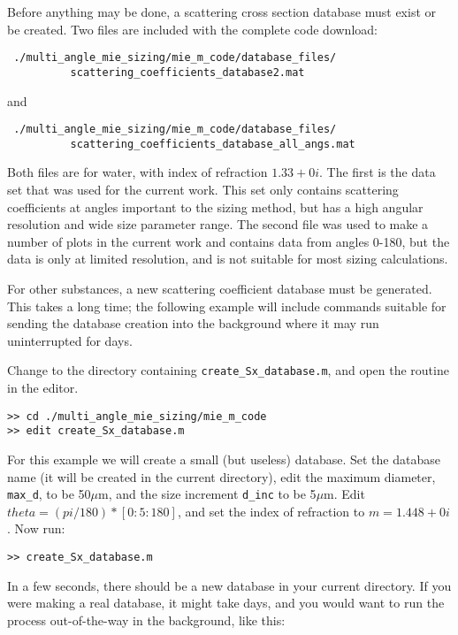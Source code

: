 Before anything may be done, a scattering cross section database must exist or be created.  Two files are included with the complete code download:
\begin{verbatim}
 ./multi_angle_mie_sizing/mie_m_code/database_files/
          scattering_coefficients_database2.mat
\end{verbatim}
and
\begin{verbatim}
 ./multi_angle_mie_sizing/mie_m_code/database_files/
          scattering_coefficients_database_all_angs.mat
\end{verbatim}
Both files are for water, with index of refraction $1.33 + 0i$.  The first is the data set that was used for the current work.  This set only contains scattering coefficients at angles important to the sizing method, but has a high angular resolution and wide size parameter range.  The second file was used to make a number of plots in the current work and contains data from angles 0-180\textdegree, but the data is only at limited resolution, and is not suitable for most sizing calculations.

For other substances, a new scattering coefficient database must be generated.  This takes a long time; the following example will include commands suitable for sending the database creation into the background where it may run uninterrupted for days.

Change to the directory containing \texttt{create\_Sx\_database.m}, and open the routine in the editor.

\begin{verbatim}
>> cd ./multi_angle_mie_sizing/mie_m_code
>> edit create_Sx_database.m 
\end{verbatim}

For this example we will create a small (but useless) database.  Set the database name (it will be created in the current directory), edit the maximum diameter, \texttt{max\_d}, to be 50$\mu$m, and the size increment \texttt{d\_inc} to be 5$\mu$m.  Edit $theta=(pi/180)*[0:5:180]$, and set the index of refraction to $m=1.448+0i$.  Now run:

\begin{verbatim}
>> create_Sx_database.m 
\end{verbatim}

In a few seconds, there should be a new database in your current directory.  If you were making a real database, it might take days, and you would want to run the process out-of-the-way in the background, like this:

